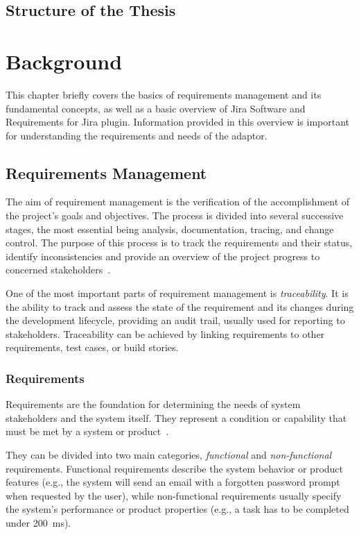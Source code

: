 \section{Structure of the Thesis}


\chapter{Background}
This chapter briefly covers the basics of requirements management and its fundamental concepts, as well as a basic overview of Jira Software and Requirements for Jira plugin. Information provided in this overview is important for understanding the requirements and needs of the adaptor.

\section{Requirements Management}
The aim of requirement management is the verification of the accomplishment of the project's goals and objectives. The process is divided into several successive stages, the most essential being analysis, documentation, tracing, and change control. The purpose of this process is to track the requirements and their status, identify inconsistencies and provide an overview of the project progress to concerned stakeholders \cite{requirements_management}.

One of the most important parts of requirement management is \emph{traceability}. It is the ability to track and assess the state of the requirement and its changes during the development lifecycle, providing an audit trail, usually used for reporting to stakeholders. Traceability can be achieved by linking requirements to other requirements, test cases, or build stories.

\subsection*{Requirements}
\label{sec:requirements}
Requirements are the foundation for determining the needs of system stakeholders and the system itself. They represent a condition or capability
that must be met by a system or product \cite{IEEE_24765-2017}.

They can be divided into two main categories, \emph{functional} and \emph{non-functional} requirements. Functional requirements describe the system behavior or product features (e.g., the system will send an email with a forgotten password prompt when requested by the user), while non-functional requirements usually specify the system's performance or product properties (e.g., a task has to be completed under 200 ms).

